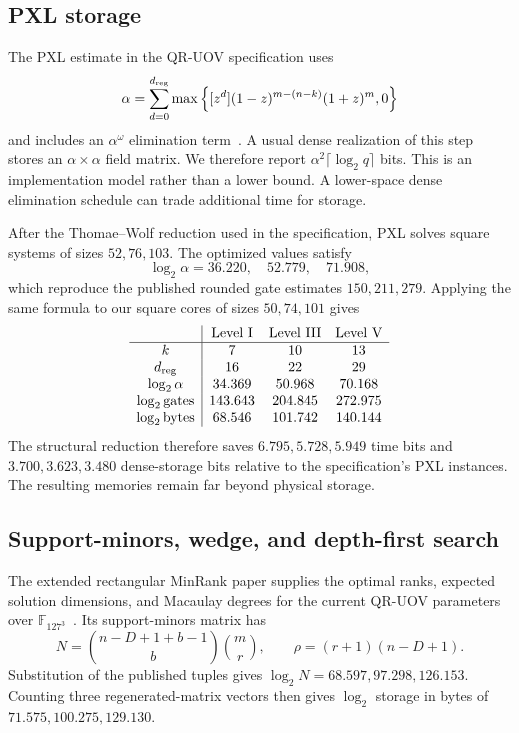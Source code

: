 \documentclass[11pt,a4paper]{article}
\theoremstyle{definition}
\theoremstyle{remark}
\newcommand{\F}{\mathbb F}
\begin{document}
\subsection{PXL storage}

The PXL estimate in the QR-UOV specification uses
\[
 \alpha=\sum_{d=0}^{d_{\rm reg}}
 \max\left\{[z^d](1-z)^{m-(n-k)}(1+z)^m,0\right\}
\]
and includes an $\alpha^\omega$ elimination term~\cite{QRUOVSpec}.  A usual
dense realization of this step stores an $\alpha\times\alpha$ field matrix.  We
therefore report $\alpha^2\lceil\log_2q\rceil$ bits.  This is an implementation
model rather than a lower bound.  A lower-space dense elimination schedule can
trade additional time for storage.

After the Thomae--Wolf reduction used in the specification, PXL solves square
systems of sizes $52,76,103$.  The optimized values satisfy
\[
 \log_2\alpha=36.220,\quad52.779,\quad71.908,
\]
which reproduce the published rounded gate estimates $150,211,279$.  Applying
the same formula to our square cores of sizes $50,74,101$ gives
\[
 \begin{array}{c|ccc}
  &\text{Level I}&\text{Level III}&\text{Level V}\\ \hline
 k&7&10&13\\
 d_{\rm reg}&16&22&29\\
 \log_2\alpha&34.369&50.968&70.168\\
 \log_2\text{gates}&143.643&204.845&272.975\\
 \log_2\text{bytes}&68.546&101.742&140.144
 \end{array}
\]
The structural reduction therefore saves $6.795,5.728,5.949$ time bits and
$3.700,3.623,3.480$ dense-storage bits relative to the specification's PXL
instances.  The resulting memories remain far beyond physical storage.

\subsection{Support-minors, wedge, and depth-first search}

The extended rectangular MinRank paper supplies the optimal ranks, expected
solution dimensions, and Macaulay degrees for the current QR-UOV parameters
over $\F_{127^3}$~\cite{Suzuki}.  Its support-minors matrix has
\[
 N=\binom{n-D+1+b-1}{b}\binom{m}{r},
 \qquad
 \rho=(r+1)(n-D+1).
\]
Substitution of the published tuples gives
$\log_2N=68.597,97.298,126.153$.  Counting three regenerated-matrix vectors
then gives $\log_2$ storage in bytes of $71.575,100.275,129.130$.
\end{document}
